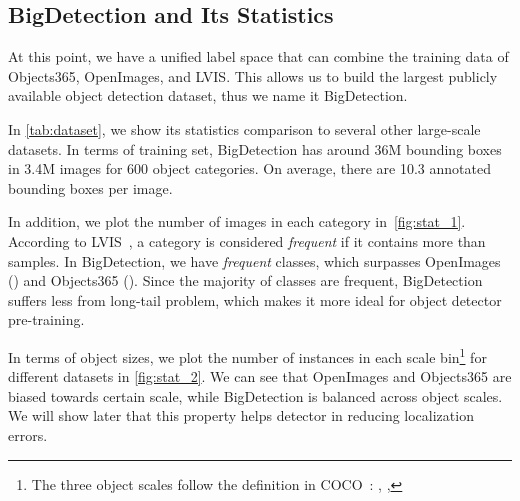 \documentclass[10pt,twocolumn,letterpaper]{article}
\begin{document}
\subsection{BigDetection and Its Statistics}
\label{subsec:statistics}

At this point, we have a unified label space that can combine the training data of Objects365, OpenImages, and LVIS.
This allows us to build the largest publicly available object detection dataset, thus we name it BigDetection.


In \cref{tab:dataset}, we show its statistics comparison to several other large-scale datasets. 
In terms of training set, BigDetection has around 36M bounding boxes in 3.4M images for 600 object categories. On average, there are 10.3 annotated bounding boxes per image.

In addition, we plot the number of images in each category in~\cref{fig:stat_1}.
According to LVIS~\cite{gupta2019lvis}, a category is considered \textit{frequent} if it contains more than  samples.
In BigDetection, we have  \textit{frequent} classes, which surpasses OpenImages () and Objects365 (). 
Since the majority of classes are frequent, BigDetection suffers less from long-tail problem, which makes it more ideal for object detector pre-training.

In terms of object sizes, we plot the number of instances in each scale bin\footnote{The three object scales follow the definition in COCO~\cite{lin2014microsoft}: , , } for different datasets in \cref{fig:stat_2}.
We can see that OpenImages and Objects365 are biased towards certain scale, while BigDetection is balanced across object scales.
We will show later that this property helps detector in reducing localization errors.
 
\end{document}
